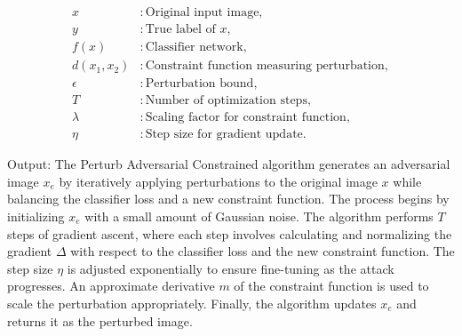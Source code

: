 \begin{align*}
x & : \text{Original input image}, \\
y & : \text{True label of } x, \\
f(x) & : \text{Classifier network}, \\
d(x_1, x_2) & : \text{Constraint function measuring perturbation}, \\
\epsilon & : \text{Perturbation bound}, \\
T & : \text{Number of optimization steps}, \\
\lambda & : \text{Scaling factor for constraint function}, \\
\eta & : \text{Step size for gradient update}.
\end{align*}

Output: The Perturb Adversarial Constrained algorithm generates an adversarial image $x_e$ by iteratively applying perturbations to the original image $x$ while balancing the classifier loss and a new constraint function. The process begins by initializing $x_e$ with a small amount of Gaussian noise. The algorithm performs $T$ steps of gradient ascent, where each step involves calculating and normalizing the gradient $\Delta$ with respect to the classifier loss and the new constraint function. The step size $\eta$ is adjusted exponentially to ensure fine-tuning as the attack progresses. An approximate derivative $m$ of the constraint function is used to scale the perturbation appropriately. Finally, the algorithm updates $x_e$ and returns it as the perturbed image.

